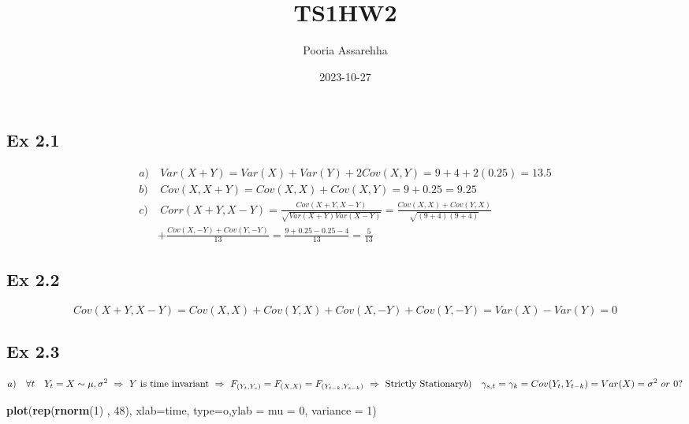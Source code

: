 \documentclass[
]{article}
\title{TS1HW2}
\author{Pooria Assarehha}
\date{2023-10-27}
\newenvironment{Shaded}{\begin{snugshade}}{\end{snugshade}}
\newcommand{\AttributeTok}[1]{\textcolor[rgb]{0.13,0.29,0.53}{#1}}
\newcommand{\DecValTok}[1]{\textcolor[rgb]{0.00,0.00,0.81}{#1}}
\newcommand{\FunctionTok}[1]{\textcolor[rgb]{0.13,0.29,0.53}{\textbf{#1}}}
\newcommand{\NormalTok}[1]{#1}
\newcommand{\StringTok}[1]{\textcolor[rgb]{0.31,0.60,0.02}{#1}}
\begin{document}
\maketitle

\subsection{Ex 2.1}\label{ex-2.1}

\[
\begin{align}
a) & \ Var(X+Y) = Var(X) + Var(Y) + 2Cov(X,Y) = 9 + 4 + 2(0.25) = 13.5 \\
b) & \ Cov(X, X+Y) = Cov(X,X) + Cov(X,Y) = 9 + 0.25 = 9.25 \\
c) & \ Corr(X+Y,X-Y) = \frac{Cov(X+Y, X-Y)}{\sqrt{Var(X+Y)Var(X-Y)}} = \frac{Cov(X,X)+Cov(Y,X)}{\sqrt{(9+4)(9+4)}} \\
& + \frac{Cov(X,-Y) + Cov(Y,-Y)}{13} = \frac{9+0.25-0.25-4}{13} = \frac{5}{13}
\end{align}
\]

\subsection{Ex 2.2}\label{ex-2.2}

\[
Cov(X+Y,X-Y) = Cov(X,X)+Cov(Y,X) + Cov(X,-Y) + Cov(Y,-Y) = Var(X)-Var(Y) = 0
\]

\subsection{Ex 2.3}\label{ex-2.3}

\[
a) \quad \forall t \quad Y_t  = X \sim \mu , \sigma^2 \ \Rightarrow \ Y \ \text{is time invariant} \ \Rightarrow \ F_{(Y_t, Y_s)} = F_{(X,X)} = F_{(Y_{t-k}, Y_{s-k})} \ \Rightarrow \ \text{Strictly Stationary} \\
b) \quad \gamma_{s,t} = \gamma_k = Cov(Y_t, Y_{t-k}) = Var(X) = \sigma^2 \ or \  0?
\]

\begin{Shaded}
\begin{Highlighting}[]
\FunctionTok{plot}\NormalTok{(}\FunctionTok{rep}\NormalTok{(}\FunctionTok{rnorm}\NormalTok{(}\DecValTok{1}\NormalTok{) , }\DecValTok{48}\NormalTok{), }\AttributeTok{xlab=}\StringTok{\textquotesingle{}time\textquotesingle{}}\NormalTok{, }\AttributeTok{type=}\StringTok{\textquotesingle{}o\textquotesingle{}}\NormalTok{,}\AttributeTok{ylab =} \StringTok{\textquotesingle{}mu = 0, variance = 1\textquotesingle{}}\NormalTok{)}
\end{Highlighting}
\end{Shaded}
\end{document}
